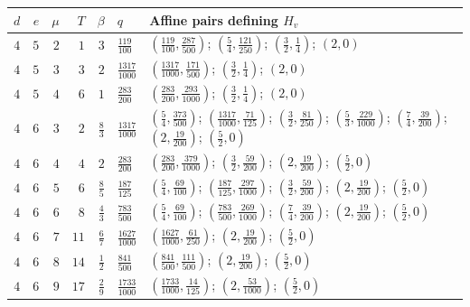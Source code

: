 \begin{center}
\scriptsize
\begin{tabular}{rrrrrlp{7.0cm}}
\hline
$d$ & $e$ & $\mu$ & $T$ & $\beta$ & $q$ & Affine pairs defining $H_v$ \\
\hline
\(4\) & \(5\) & \(2\) & \(1\) & \(3\) & \(\tfrac{119}{100}\) & \((\tfrac{119}{100},\tfrac{287}{500})\); \((\tfrac{5}{4},\tfrac{121}{250})\); \((\tfrac{3}{2},\tfrac{1}{4})\); \((2,0)\) \\[3pt]
\(4\) & \(5\) & \(3\) & \(3\) & \(2\) & \(\tfrac{1317}{1000}\) & \((\tfrac{1317}{1000},\tfrac{171}{500})\); \((\tfrac{3}{2},\tfrac{1}{4})\); \((2,0)\) \\[3pt]
\(4\) & \(5\) & \(4\) & \(6\) & \(1\) & \(\tfrac{283}{200}\) & \((\tfrac{283}{200},\tfrac{293}{1000})\); \((\tfrac{3}{2},\tfrac{1}{4})\); \((2,0)\) \\[3pt]
\(4\) & \(6\) & \(3\) & \(2\) & \(\tfrac{8}{3}\) & \(\tfrac{1317}{1000}\) & \((\tfrac{5}{4},\tfrac{373}{500})\); \((\tfrac{1317}{1000},\tfrac{71}{125})\); \((\tfrac{3}{2},\tfrac{81}{250})\); \((\tfrac{5}{3},\tfrac{229}{1000})\); \((\tfrac{7}{4},\tfrac{39}{200})\); \((2,\tfrac{19}{200})\); \((\tfrac{5}{2},0)\) \\[3pt]
\(4\) & \(6\) & \(4\) & \(4\) & \(2\) & \(\tfrac{283}{200}\) & \((\tfrac{283}{200},\tfrac{379}{1000})\); \((\tfrac{3}{2},\tfrac{59}{200})\); \((2,\tfrac{19}{200})\); \((\tfrac{5}{2},0)\) \\[3pt]
\(4\) & \(6\) & \(5\) & \(6\) & \(\tfrac{8}{5}\) & \(\tfrac{187}{125}\) & \((\tfrac{5}{4},\tfrac{69}{100})\); \((\tfrac{187}{125},\tfrac{297}{1000})\); \((\tfrac{3}{2},\tfrac{59}{200})\); \((2,\tfrac{19}{200})\); \((\tfrac{5}{2},0)\) \\[3pt]
\(4\) & \(6\) & \(6\) & \(8\) & \(\tfrac{4}{3}\) & \(\tfrac{783}{500}\) & \((\tfrac{5}{4},\tfrac{69}{100})\); \((\tfrac{783}{500},\tfrac{269}{1000})\); \((\tfrac{7}{4},\tfrac{39}{200})\); \((2,\tfrac{19}{200})\); \((\tfrac{5}{2},0)\) \\[3pt]
\(4\) & \(6\) & \(7\) & \(11\) & \(\tfrac{6}{7}\) & \(\tfrac{1627}{1000}\) & \((\tfrac{1627}{1000},\tfrac{61}{250})\); \((2,\tfrac{19}{200})\); \((\tfrac{5}{2},0)\) \\[3pt]
\(4\) & \(6\) & \(8\) & \(14\) & \(\tfrac{1}{2}\) & \(\tfrac{841}{500}\) & \((\tfrac{841}{500},\tfrac{111}{500})\); \((2,\tfrac{19}{200})\); \((\tfrac{5}{2},0)\) \\[3pt]
\(4\) & \(6\) & \(9\) & \(17\) & \(\tfrac{2}{9}\) & \(\tfrac{1733}{1000}\) & \((\tfrac{1733}{1000},\tfrac{14}{125})\); \((2,\tfrac{53}{1000})\); \((\tfrac{5}{2},0)\) \\[3pt]
\hline
\end{tabular}
\end{center}
